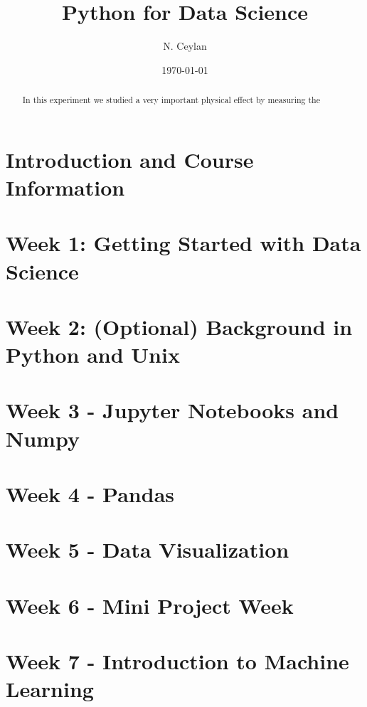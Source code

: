 \documentclass[letterpaper,12pt]{article}
\begin{document}
\title{Python for Data Science}
\author{N. Ceylan}
\date{\today}
\maketitle

\begin{abstract}
	
	
In this experiment we studied a very important physical effect by measuring the


\end{abstract}


\section{Introduction and Course Information}



\section{Week 1: Getting Started with Data Science}

\section{Week 2: (Optional) Background in Python and Unix}

\section{Week 3 - Jupyter Notebooks and Numpy}



\section{Week 4 - Pandas}


\section{Week 5 - Data Visualization
}


\section{Week 6 - Mini Project Week
}

\section{Week 7 - Introduction to Machine Learning
}
\end{document}
